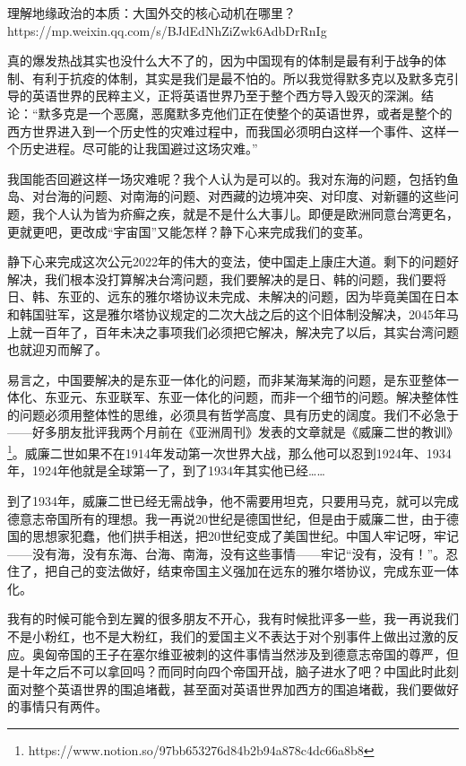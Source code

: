 \documentclass[UTF8, 12pt, a4paper]{ctexrep}
\begin{document}
理解地缘政治的本质：大国外交的核心动机在哪里？ https://mp.weixin.qq.com/s/BJdEdNhZiZwk6AdbDrRnIg

真的爆发热战其实也没什么大不了的，因为中国现有的体制是最有利于战争的体制、有利于抗疫的体制，其实是我们是最不怕的。所以我觉得默多克以及默多克引导的英语世界的民粹主义，正将英语世界乃至于整个西方导入毁灭的深渊。结论：“默多克是一个恶魔，恶魔默多克他们正在使整个的英语世界，或者是整个的西方世界进入到一个历史性的灾难过程中，而我国必须明白这样一个事件、这样一个历史进程。尽可能的让我国避过这场灾难。”

我国能否回避这样一场灾难呢？我个人认为是可以的。我对东海的问题，包括钓鱼岛、对台海的问题、对南海的问题、对西藏的边境冲突、对印度、对新疆的这些问题，我个人认为皆为疥癣之疾，就是不是什么大事儿。即便是欧洲同意台湾更名，更就更吧，更改成“宇宙国”又能怎样？静下心来完成我们的变革。

静下心来完成这次公元2022年的伟大的变法，使中国走上康庄大道。剩下的问题好解决，我们根本没打算解决台湾问题，我们要解决的是日、韩的问题，我们要将日、韩、东亚的、远东的雅尔塔协议未完成、未解决的问题，因为毕竟美国在日本和韩国驻军，这是雅尔塔协议规定的二次大战之后的这个旧体制没解决，2045年马上就一百年了，百年未决之事项我们必须把它解决，解决完了以后，其实台湾问题也就迎刃而解了。

易言之，中国要解决的是东亚一体化的问题，而非某海某海的问题，是东亚整体一体化、东亚元、东亚联军、东亚一体化的问题，而非一个细节的问题。解决整体性的问题必须用整体性的思维，必须具有哲学高度、具有历史的阔度。我们不必急于——好多朋友批评我两个月前在《亚洲周刊》发表的文章就是《威廉二世的教训》\footnote{https://www.notion.so/97bb653276d84b2b94a878c4dc66a8b8}。威廉二世如果不在1914年发动第一次世界大战，那么他可以忍到1924年、1934年，1924年他就是全球第一了，到了1934年其实他已经……

到了1934年，威廉二世已经无需战争，他不需要用坦克，只要用马克，就可以完成德意志帝国所有的理想。我一再说20世纪是德国世纪，但是由于威廉二世，由于德国的思想家犯蠢，他们拱手相送，把20世纪变成了美国世纪。中国人牢记呀，牢记——没有海，没有东海、台海、南海，没有这些事情——牢记“没有，没有！”。忍住了，把自己的变法做好，结束帝国主义强加在远东的雅尔塔协议，完成东亚一体化。

我有的时候可能令到左翼的很多朋友不开心，我有时候批评多一些，我一再说我们不是小粉红，也不是大粉红，我们的爱国主义不表达于对个别事件上做出过激的反应。奥匈帝国的王子在塞尔维亚被刺的这件事情当然涉及到德意志帝国的尊严，但是十年之后不可以拿回吗？而同时向四个帝国开战，脑子进水了吧？中国此时此刻面对整个英语世界的围追堵截，甚至面对英语世界加西方的围追堵截，我们要做好的事情只有两件。
\end{document}
